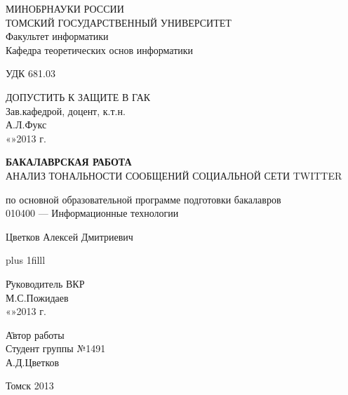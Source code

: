 \large
\thispagestyle{empty}
\begin{center}
МИНОБРНАУКИ РОССИИ\\
ТОМСКИЙ ГОСУДАРСТВЕННЫЙ УНИВЕРСИТЕТ\\
Факультет информатики\\
Кафедра теоретических основ информатики\\
\end{center}

УДК 681.03

\vspace{0.5cm}

\begin{flushright}
ДОПУСТИТЬ К ЗАЩИТЕ В ГАК\\
Зав.кафедрой, доцент, к.т.н.\\
\makebox[3cm]{\hrulefill}А.Л.Фукс\\
«\makebox[0.8cm]{\hrulefill}»\makebox[1.5cm]{\hrulefill}2013 г.\\
\end{flushright}



\begin{center}

\vspace{1.5cm}
{\bf БАКАЛАВРСКАЯ РАБОТА}\\
\vspace{0.5cm}
АНАЛИЗ ТОНАЛЬНОСТИ СООБЩЕНИЙ СОЦИАЛЬНОЙ СЕТИ TWITTER

\vspace{0.5cm}
по основной образовательной программе подготовки бакалавров\\
010400 --- Информационные технологии

\vspace{0.5cm}

Цветков Алексей Дмитриевич


\end{center}

\vskip 0pt plus 1filll

\begin{tabbing}
\hspace{10cm}\=Руководитель ВКР\\
\>\makebox[3cm]{\hrulefill}М.С.Пожидаев\\
\>«\makebox[0.8cm]{\hrulefill}»\makebox[1.5cm]{\hrulefill}2013 г.\\
\end{tabbing}

\begin{tabbing}
\hspace{10cm}\=Автор работы\\
\>Студент группы №1491\\
\>\makebox[3cm]{\hrulefill}А.Д.Цветков\\
\end{tabbing}

\vspace*{1cm}

\begin{center}
Томск 2013
\end{center}
\normalsize
